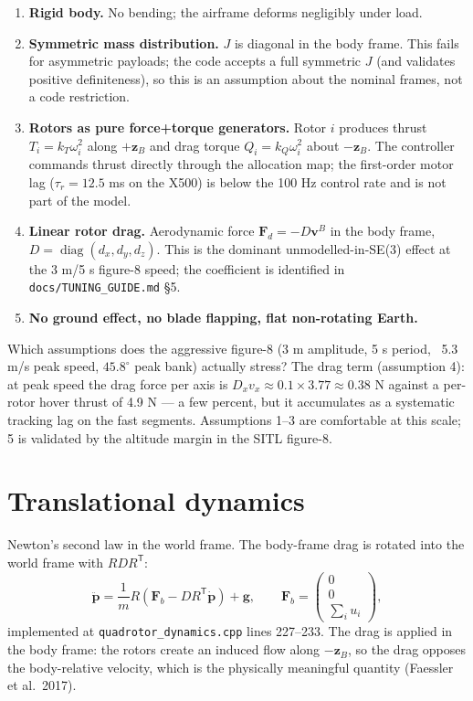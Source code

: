 \documentclass[11pt]{article}
\DeclareMathOperator{\diag}{diag}
\begin{document}
\begin{enumerate}
  \item \textbf{Rigid body.} No bending; the airframe deforms negligibly under load.
  \item \textbf{Symmetric mass distribution.} $J$ is diagonal in the body frame. This fails
        for asymmetric payloads; the code accepts a full symmetric $J$ (and validates
        positive definiteness), so this is an assumption about the nominal frames, not a
        code restriction.
  \item \textbf{Rotors as pure force+torque generators.} Rotor $i$ produces thrust
        $T_i = k_T \omega_i^2$ along $+\bm z_B$ and drag torque
        $Q_i = k_Q \omega_i^2$ about $-\bm z_B$. The controller commands thrust directly
        through the allocation map; the first-order motor lag
        ($\tau_r = 12.5$ ms on the X500) is below the 100 Hz control rate and is not part of
        the model.
  \item \textbf{Linear rotor drag.} Aerodynamic force $\bm F_d = -D \bm v^B$ in the body
        frame, $D = \diag(d_x, d_y, d_z)$. This is the dominant unmodelled-in-SE(3) effect
        at the 3 m/5 s figure-8 speed; the coefficient is identified in
        \texttt{docs/TUNING\_GUIDE.md} \S5.
  \item \textbf{No ground effect, no blade flapping, flat non-rotating Earth.}
\end{enumerate}

Which assumptions does the aggressive figure-8 (3 m amplitude, 5 s period, ~5.3 m/s peak
speed, $45.8^\circ$ peak bank) actually stress? The drag term (assumption 4): at peak speed
the drag force per axis is $D_x v_x \approx 0.1 \times 3.77 \approx 0.38$ N against a
per-rotor hover thrust of 4.9 N — a few percent, but it accumulates as a systematic tracking
lag on the fast segments. Assumptions 1--3 are comfortable at this scale; 5 is validated by
the altitude margin in the SITL figure-8.

\section{Translational dynamics}

Newton's second law in the world frame. The body-frame drag is rotated into the world frame
with $R D R^{\mathsf T}$:
\begin{equation}
  \ddot{\bm p} = \frac{1}{m} R \left( \bm F_b - D R^{\mathsf T} \dot{\bm p} \right)
  + \bm g, \qquad \bm F_b = \begin{pmatrix} 0 \\ 0 \\ \sum_i u_i \end{pmatrix},
  \label{eq:trans}
\end{equation}
implemented at \texttt{quadrotor\_dynamics.cpp} lines 227--233. The drag is applied in the
body frame: the rotors create an induced flow along $-\bm z_B$, so the drag opposes the
body-relative velocity, which is the physically meaningful quantity (Faessler et al.\ 2017).
\end{document}
